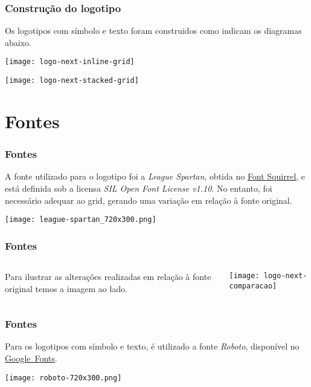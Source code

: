 \documentclass[10pt,aspectratio=43,xcolor,compress]{beamer}
\begin{document}
\begin{frame}
  \frametitle{Construção do logotipo}
  Os logotipos com símbolo e texto foram construidos como indicam os diagramas
  abaixo.

  \centering
  \texttt{[image: logo-next-inline-grid]}

  \centering
  \texttt{[image: logo-next-stacked-grid]}

\end{frame}

\section{Fontes}

\begin{frame}
  \frametitle{Fontes}

  A fonte utilizado para o logotipo foi a \emph{League Spartan}, obtida no
  \href{https://www.fontsquirrel.com/fonts/league-spartan}{Font Squirrel}, e
  está definida sob a licensa \emph{SIL Open Font License v1.10}. No entanto,
  foi necessário adequar ao grid, gerando uma variação em relação à fonte
  original.
  
  \centering
  \texttt{[image: league-spartan\_720x300.png]}

\end{frame}
% 

\begin{frame}
  \frametitle{Fontes}
  \begin{columns}
    \begin{column}{.35\textwidth}
      Para ilustrar as alterações realizadas em relação à fonte original temos a imagem ao lado.
    \end{column}
    \begin{column}{.55\textwidth}
      \centering
    \texttt{[image: logo-next-comparacao]}
     \end{column}
   \end{columns}

\end{frame}

\begin{frame}
  \frametitle{Fontes}
  Para os logotipos com símbolo e texto, é utilizado a fonte \emph{Roboto},
  disponível no \href{https://fonts.google.com/specimen/Roboto}{Google~Fonts}.

  \centering
  \texttt{[image: roboto-720x300.png]}

\end{frame}
\end{document}
